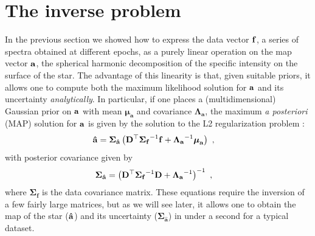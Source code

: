 \documentclass[modern]{aastex631}
\begin{document}
\section{The inverse problem}
\label{sec:inverse}
%
In the previous section we showed how to express the data vector ${\mathbf{f}}$, a series of spectra obtained at different epochs, as a purely linear operation on the map vector ${\mathbf{a}}$, the spherical harmonic decomposition of the specific intensity on the surface of the star. 
The advantage of this linearity is that, given suitable priors, it allows one to compute both the maximum likelihood solution for ${\mathbf{a}}$ and its uncertainty \emph{analytically}. 
In particular, if one places a (multidimensional) Gaussian prior on ${\mathbf{a}}$ with mean $\boldsymbol{\mu}_\mathbf{a}$ and covariance $\boldsymbol{\Lambda}_\mathbf{a}$, the maximum \emph{a posteriori} (MAP)
solution for ${\mathbf{a}}$ is given by the solution to the L2 regularization problem \citep[see, e.g.,][]{Luger2016}:
%
\begin{align}
    \label{eq:inverse:ahat}
    {\ensuremath{\mathbf{\hat{a}}}} & =
    \boldsymbol{\Sigma}_\mathbf{\hat{a}}
    \left(
    {\mathbf{D}}^\top
    {\boldsymbol{\Sigma}_\mathbf{f}}^{-1}
    {\mathbf{f}}
    +
    {\boldsymbol{\Lambda}_{{\mathbf{a}}}}^{-1} \boldsymbol{\mu}_\mathbf{a}
    \right)
    \hskip 0.33em,
\end{align}
%
with posterior covariance given by
%
\begin{align}
    \label{eq:inverse:acov}
    \boldsymbol{\Sigma}_\mathbf{\hat{a}} & =
    \left(
    {\mathbf{D}}^\top
    {\boldsymbol{\Sigma}_\mathbf{f}}^{-1}
    {\mathbf{D}}
    +
    {\boldsymbol{\Lambda}_{{\mathbf{a}}}}^{-1}
    \right)^{-1}
    \hskip 0.33em,
\end{align}
%
where $\boldsymbol{\Sigma}_\mathbf{f}$ is the data covariance matrix. 
These equations require the inversion of a few fairly large matrices, but as we will see later, it allows one to obtain the map of the star (${\mathbf{\hat{a}}}$) and its uncertainty ($\boldsymbol{\Sigma}_{\mathbf{\hat{a}}}$) in under a second for a typical dataset.
\end{document}

